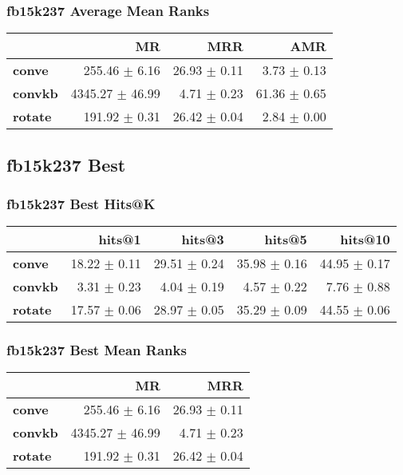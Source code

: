 \documentclass{article}
\begin{document}
\subsubsection{fb15k237 Average Mean Ranks}
    \begin{center}
    \begin{tabular}{lrrr}
\toprule
{} &               MR &           MRR &           AMR \\
\midrule
\textbf{conve } &    255.46 $\pm$ 6.16 &  26.93 $\pm$ 0.11 &   3.73 $\pm$ 0.13 \\
\textbf{convkb} &  4345.27 $\pm$ 46.99 &   4.71 $\pm$ 0.23 &  61.36 $\pm$ 0.65 \\
\textbf{rotate} &    191.92 $\pm$ 0.31 &  26.42 $\pm$ 0.04 &   2.84 $\pm$ 0.00 \\
\bottomrule
\end{tabular}

    \end{center}
\subsection{fb15k237 Best}
\subsubsection{fb15k237 Best Hits@K}
    \begin{center}
    \begin{tabular}{lrrrr}
\toprule
{} &        hits@1 &        hits@3 &        hits@5 &       hits@10 \\
\midrule
\textbf{conve } &  18.22 $\pm$ 0.11 &  29.51 $\pm$ 0.24 &  35.98 $\pm$ 0.16 &  44.95 $\pm$ 0.17 \\
\textbf{convkb} &   3.31 $\pm$ 0.23 &   4.04 $\pm$ 0.19 &   4.57 $\pm$ 0.22 &   7.76 $\pm$ 0.88 \\
\textbf{rotate} &  17.57 $\pm$ 0.06 &  28.97 $\pm$ 0.05 &  35.29 $\pm$ 0.09 &  44.55 $\pm$ 0.06 \\
\bottomrule
\end{tabular}

    \end{center}
\subsubsection{fb15k237 Best Mean Ranks}
    \begin{center}
    \begin{tabular}{lrr}
\toprule
{} &               MR &           MRR \\
\midrule
\textbf{conve } &    255.46 $\pm$ 6.16 &  26.93 $\pm$ 0.11 \\
\textbf{convkb} &  4345.27 $\pm$ 46.99 &   4.71 $\pm$ 0.23 \\
\textbf{rotate} &    191.92 $\pm$ 0.31 &  26.42 $\pm$ 0.04 \\
\bottomrule
\end{tabular}

    \end{center}
\end{document}
